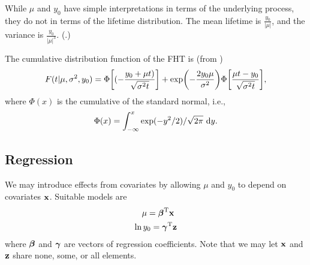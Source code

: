 While $\mu$ and $y_0$ have simple interpretations in terms of the underlying process, they do not in terms of the lifetime distribution. The mean lifetime is $\frac{y_0}{|\mu|}$, and the variance is $\frac{y_0}{|\mu|^3}$. (\cite[62]{caroni2017}.)

The cumulative distribution function of the FHT is (from \cite[7]{threg})
\begin{equation}\label{eq:cumulative}
    F(t|\mu,\sigma^2,y_0)=\Phi\sqb*{(-\frac{y_0+\mu t)}{\sqrt{\sigma^2t}}}+\exp\p*{-\frac{2y_0\mu}{\sigma^2}}\Phi\sqb*{\frac{\mu t-y_0}{\sqrt{\sigma^2t}}},
\end{equation}
where $\Phi(x)$ is the cumulative of the standard normal, i.e.,
\begin{equation}
    \Phi(x)=\int_{-\infty}^x\exp(-y^2/2)/\sqrt{2\pi}\text{~d}y.
\end{equation}

\subsection{Regression}
We may introduce effects from covariates by allowing $\mu$ and $y_0$ to depend on covariates $\mathbf{x}$. Suitable models are
\begin{align}\label{eq:coeffs}
\begin{split}
    \mu=\bbeta^\T\x \\
    \ln y_0=\bgamma^\T\z
\end{split}
\end{align}
where $\boldsymbol{\beta}$ and $\boldsymbol{\gamma}$ are vectors of regression coefficients. Note that we may let $\mathbf{x}$ and $\mathbf{z}$ share none, some, or all elements.

